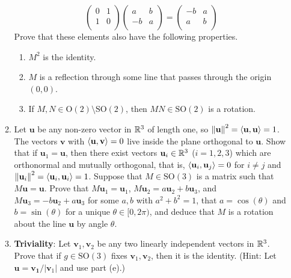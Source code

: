 \documentclass[../psets.tex]{subfiles}
\begin{document}
\begin{enumerate}
\begin{enumerate}
        \begin{equation*}
            \begin{pmatrix}
                0 & 1\\
                1 & 0\\
            \end{pmatrix}
            \begin{pmatrix}
                a & b\\
                -b & a\\
            \end{pmatrix}
            =
            \begin{pmatrix}
                -b & a\\
                a & b\\
            \end{pmatrix}
        \end{equation*}
        Prove that these elements also have the following properties.
        \begin{enumerate}
            \item $M^2$ is the identity.
            \item $M$ is a reflection through some line that passes through the origin $(0,0)$.
            \item If $M,N\in\text{O}(2)\setminus\text{SO}(2)$, then $MN\in\text{SO}(2)$ is a rotation.
        \end{enumerate}
        \item Let $\mathbf{u}$ be any non-zero vector in $\mathbb{R}^3$ of length one, so $\norm{\mathbf{u}}^2=\left\langle{\mathbf{u}},{\mathbf{u}}\right\rangle=1$. The vectors $\mathbf{v}$ with $\left\langle{\mathbf{u}},{\mathbf{v}}\right\rangle=0$ live inside the plane orthogonal to $\mathbf{u}$. Show that if $\mathbf{u}_1=\mathbf{u}$, then there exist vectors $\mathbf{u}_i\in\mathbb{R}^3$ ($i=1,2,3$) which are orthonormal and mutually orthogonal, that is, $\left\langle{\mathbf{u}_i},{\mathbf{u}_j}\right\rangle=0$ for $i\neq j$ and $\norm{\mathbf{u}_i}^2=\left\langle{\mathbf{u}_i},{\mathbf{u}_i}\right\rangle=1$. Suppose that $M\in\text{SO}(3)$ is a matrix such that $M\mathbf{u}=\mathbf{u}$. Prove that $M\mathbf{u}_1=\mathbf{u}_1$, $M\mathbf{u}_2=a\mathbf{u}_2+b\mathbf{u}_3$, and $M\mathbf{u}_3=-b\mathbf{u}_2+a\mathbf{u}_3$ for some $a,b$ with $a^2+b^2=1$, that $a=\cos(\theta)$ and $b=\sin(\theta)$ for a unique $\theta\in[0,2\pi)$, and deduce that $M$ is a rotation about the line $\mathbf{u}$ by angle $\theta$.
        \item \textbf{Triviality}: Let $\mathbf{v}_1,\mathbf{v}_2$ be any two linearly independent vectors in $\mathbb{R}^3$. Prove that if $g\in\text{SO}(3)$ fixes $\mathbf{v}_1,\mathbf{v}_2$, then it is the identity. (Hint: Let $\mathbf{u}=\mathbf{v_1}/|\mathbf{v}_1|$ and use part (e).)

\end{enumerate}
\end{enumerate}
\end{document}
